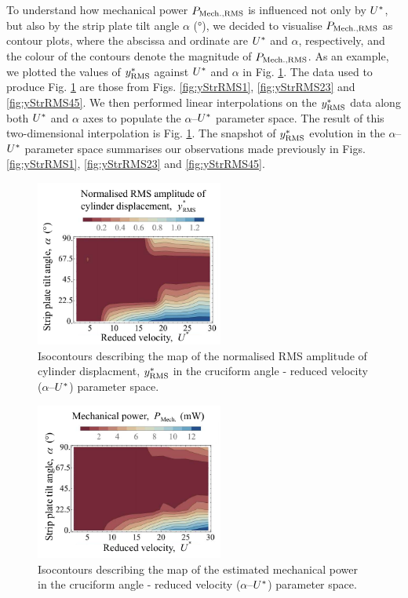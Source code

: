 \documentclass[oneside]{utmthesis}
\begin{document}
To understand how mechanical power $P_{\text{Mech.,RMS}}$ is influenced not only by $U^{*}$, but also by the strip plate tilt angle $\alpha$ (\si{\degree}), we decided to visualise $P_{\text{Mech.,RMS}}$ as contour plots, where the abscissa and ordinate are $U^{*}$ and $\alpha$, respectively, and the colour of the contours denote the magnitude of $P_{\text{Mech.,RMS}}$. As an example, we plotted the values of $y^{*}_{\text{RMS}}$ against $U^{*}$ and $\alpha$ in Fig. \ref{fig:yRMSContour}. The data used to produce Fig. \ref{fig:yRMSContour} are those from Figs. \ref{fig:yStrRMS1}, \ref{fig:yStrRMS23} and \ref{fig:yStrRMS45}. We then performed linear interpolations on the $y^{*}_{\text{RMS}}$ data along both $U^{*}$ and $\alpha$ axes to populate the $\alpha$--$U^{*}$ parameter space. The result of this two-dimensional interpolation is Fig. \ref{fig:yRMSContour}. The snapshot of $y^{*}_{\text{RMS}}$ evolution in the $\alpha$--$U^{*}$ parameter space summarises our observations made previously in Figs. \ref{fig:yStrRMS1}, \ref{fig:yStrRMS23} and \ref{fig:yStrRMS45}.

\begin{figure}
  \centering
  \includegraphics[width=0.55\textwidth]{figs/yRMSContour}
  \caption{Isocontours describing the map of the normalised RMS amplitude of cylinder displacment, $y^{*}_{\text{RMS}}$ in the cruciform angle - reduced velocity ($\alpha$--$U^{*}$) parameter space.}
  \label{fig:yRMSContour}
\end{figure}

\begin{figure}
  \centering
  \includegraphics[width=0.55\textwidth]{figs/mechanicalPowerContours}
  \caption{Isocontours describing the map of the estimated mechanical power in the cruciform angle - reduced velocity ($\alpha$--$U^{*}$) parameter space.}
  \label{fig:mechanicalPowerContour}
\end{figure}
\end{document}
